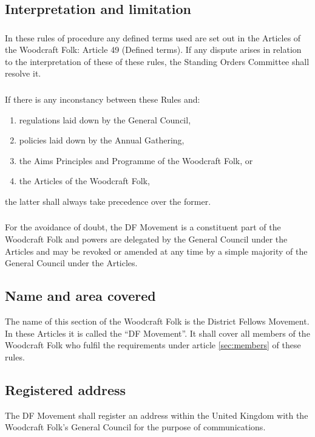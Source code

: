 \documentclass[a4paper, 11pt]{report}
\begin{document}
\subsection{Interpretation and limitation}
\subsubsection{}
In these rules of procedure any defined terms used are set out in the Articles of the Woodcraft Folk: Article 49 (Defined terms). If any dispute arises in relation to the interpretation of these of these rules, the Standing Orders Committee shall resolve it.
\subsubsection{}
If there is any inconstancy between these Rules and:
\begin{enumerate}[\hspace{0.5cm}(a)]
\item regulations laid down by the General Council,
\item policies laid down by the Annual Gathering,
\item the Aims Principles and Programme of the Woodcraft Folk, or
\item the Articles of the Woodcraft Folk,
\end{enumerate}
the latter shall always take precedence over the former.

\subsubsection{}
For the avoidance of doubt, the DF Movement is a constituent part of the Woodcraft Folk and powers are delegated by the General Council under the Articles and may be revoked or amended at any time by a simple majority of the General Council under the Articles.

\subsection{Name and area covered}
The name of this section of the Woodcraft Folk is the District Fellows Movement. In these Articles it is called the ``DF Movement''. It shall cover all members of the Woodcraft Folk who fulfil the requirements under article \ref{sec:members} of these rules.

\subsection{Registered address}
The DF Movement shall register an address within the United Kingdom with the Woodcraft Folk's General Council for the purpose of communications.
\end{document}
